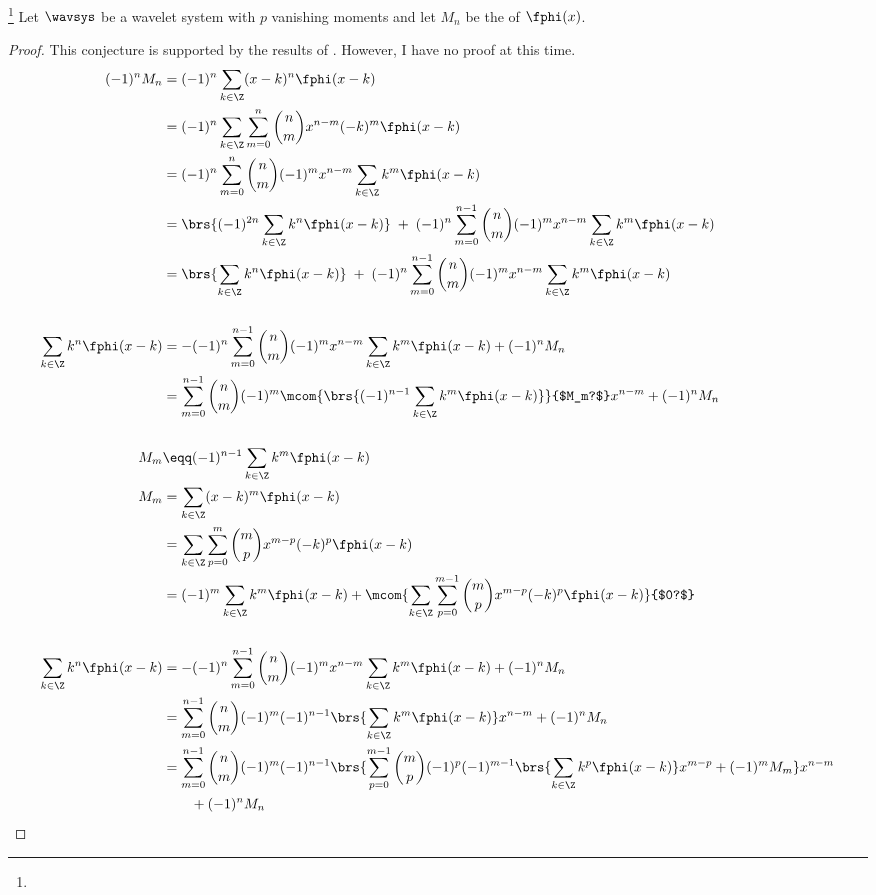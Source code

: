 \begin{conjecture}
\footnote{
  }
\label{cnj:sfixc}
Let $\wavsys$ be a wavelet system with $p$ vanishing moments
and let $M_n$ be the   of $\fphi(x)$.
\end{conjecture}
\begin{proof}
This conjecture is supported by the results of .
However, I have no proof at this time.
\begin{align*}
  (-1)^n M_n
    &= (-1)^n \sum_{k\in\Z} (x-k)^n  \fphi(x-k)
  \\&= (-1)^n \sum_{k\in\Z} \sum_{m=0}^n {n\choose m}x^{n-m} (-k)^m \fphi(x-k)
  \\&= (-1)^n \sum_{m=0}^n {n\choose m}(-1)^m x^{n-m} \sum_{k\in\Z} k^m \fphi(x-k)
  \\&= \brs{(-1)^{2n} \sum_{k\in\Z} k^n \fphi(x-k)}
      \;+\; (-1)^n \sum_{m=0}^{n-1} {n\choose m}(-1)^m x^{n-m} \sum_{k\in\Z} k^m \fphi(x-k)
  \\&= \brs{\sum_{k\in\Z} k^n \fphi(x-k)}
      \;+\; (-1)^n \sum_{m=0}^{n-1} {n\choose m}(-1)^m x^{n-m} \sum_{k\in\Z} k^m \fphi(x-k)
  \\
  \\
  \sum_{k\in\Z} k^n \fphi(x-k)
    &= -(-1)^n \sum_{m=0}^{n-1} {n\choose m}(-1)^m x^{n-m} \sum_{k\in\Z} k^m \fphi(x-k)
        + (-1)^n M_n
  \\&=  \sum_{m=0}^{n-1} {n\choose m}(-1)^m
         \mcom{\brs{(-1)^{n-1}\sum_{k\in\Z} k^m \fphi(x-k)}}{$M_m?$}
         x^{n-m}
        + (-1)^n M_n
\\
\\
  M_m &\eqq (-1)^{n-1}\sum_{k\in\Z}  k^m \fphi(x-k)
\\
  M_m
    &= \sum_{k\in\Z} (x-k)^m \fphi(x-k)
  \\&= \sum_{k\in\Z} \sum_{p=0}^m {m\choose p}x^{m-p}(-k)^p \fphi(x-k)
  \\&= (-1)^m \sum_{k\in\Z} k^m \fphi(x-k)
      + \mcom{\sum_{k\in\Z} \sum_{p=0}^{m-1}{m\choose p}x^{m-p}(-k)^p \fphi(x-k)}{$0?$}
  \\
  \\
  \sum_{k\in\Z} k^n \fphi(x-k)
    &= -(-1)^n \sum_{m=0}^{n-1} {n\choose m}(-1)^m x^{n-m} \sum_{k\in\Z} k^m \fphi(x-k)
        + (-1)^n M_n
  \\&=  \sum_{m=0}^{n-1} {n\choose m}(-1)^m
         (-1)^{n-1}\brs{\sum_{k\in\Z} k^m \fphi(x-k)}
         x^{n-m}
        + (-1)^n M_n
  \\&=  \sum_{m=0}^{n-1} {n\choose m}(-1)^m
         (-1)^{n-1}
         \brs{
           \sum_{p=0}^{m-1} {m\choose p}(-1)^p
           (-1)^{m-1}\brs{\sum_{k\in\Z} k^p \fphi(x-k)}
           x^{m-p}
           + (-1)^m M_m
         }
         x^{n-m}
        \\&\qquad+ (-1)^n M_n
\end{align*}
\end{proof}

